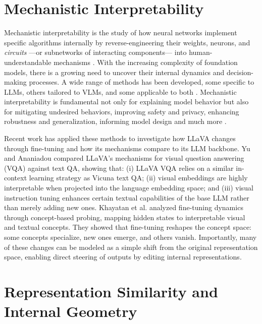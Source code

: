 \section{Mechanistic Interpretability}

Mechanistic interpretability is the study of how neural networks implement specific algorithms internally by reverse-engineering their weights, neurons, and \emph{circuits} \cite{elhage2021mathematical} ---or subnetworks of interacting components--- into human-understandable mechanisms \cite{luoUnderstandingUtilizationSurvey2024}. With the increasing complexity of foundation models, there is a growing need to uncover their internal dynamics and decision-making processes. A wide range of methods has been developed, some specific to LLMs, others tailored to VLMs, and some applicable to both \cite{luoUnderstandingUtilizationSurvey2024, linSurveyMechanisticInterpretability2025}. Mechanistic interpretability is fundamental not only for explaining model behavior but also for mitigating undesired behaviors, improving safety and privacy, enhancing robustness and generalization, informing model design and much more \cite{linSurveyMechanisticInterpretability2025}.

Recent work has applied these methods to investigate how LLaVA changes through fine-tuning and how its mechanisms compare to its LLM backbone. Yu and Ananiadou \cite{yuUnderstandingMultimodalLLMs2024} compared LLaVA's mechanisms for visual question answering (VQA) against text QA, showing that: (i) LLaVA VQA relies on a similar in-context learning strategy as Vicuna text QA; (ii) visual embeddings are highly interpretable when projected into the language embedding space; and (iii) visual instruction tuning enhances certain textual capabilities of the base LLM rather than merely adding new ones. Khayatan et al. \cite{khayatanAnalyzingFinetuningRepresentation2025} analyzed fine-tuning dynamics through concept-based probing, mapping hidden states to interpretable visual and textual concepts. They showed that fine-tuning reshapes the concept space: some concepts specialize, new ones emerge, and others vanish. Importantly, many of these changes can be modeled as a simple shift from the original representation space, enabling direct steering of outputs by editing internal representations. 

\section{Representation Similarity and Internal Geometry}

